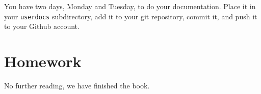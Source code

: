 \documentclass{article}
\begin{document}
    You have two days, Monday and Tuesday, to do your documentation. Place it in your \texttt{userdocs} subdirectory, add it to your git repository, commit it, and push it to your Github account.

    \section{Homework}

    No further reading, we have finished the book.
        
\end{document}
